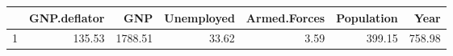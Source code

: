 \begin{table}[ht]
\centering
\begin{tabular}{rrrrrrr}
  \hline
 & GNP.deflator & GNP & Unemployed & Armed.Forces & Population & Year \\ 
  \hline
1 & 135.53 & 1788.51 & 33.62 & 3.59 & 399.15 & 758.98 \\ 
   \hline
\end{tabular}
\end{table}

